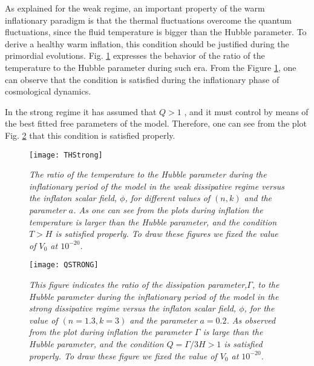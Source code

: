 \documentclass[12pt]{revtex4}
\begin{document}
{As explained for the weak regime, an important property of the warm inflationary paradigm is that the thermal fluctuations overcome the quantum fluctuations, since the fluid temperature is bigger than the Hubble parameter. To derive a healthy warm inflation, this condition should be justified during the primordial evolutions. Fig. \ref{thstrong} expresses the behavior of the ratio of the temperature to the Hubble parameter during such era. From the Figure \ref{thstrong}, one can observe that the condition is satisfied during the inflationary phase of cosmological dynamics.}

{In the strong regime  it has assumed that $Q>1$ , and it must control by means of the best fitted free parameters of the model. Therefore, one can see from the plot  Fig. \ref{QStrong} that this condition is satisfied properly.}

\begin{figure}[ht]
  \centering
  \texttt{[image: THStrong]}
  \caption{\emph{{The ratio of the temperature to the Hubble parameter during the inflationary period of the  model in the weak dissipative regime versus the inflaton scalar field, $\phi$, for different values of $(n,k)$ and the parameter $a$. As one can see from the plots during inflation the temperature is larger than the Hubble parameter, and the condition $T>H$ is satisfied properly. To draw these figures we fixed the value of $V_0$ at $10^{-20}$.}}}\label{thstrong}
\end{figure}%


\begin{figure}[ht]
  \centering
  \texttt{[image: QSTRONG]}
  \caption{\emph{{{This figure indicates the ratio of the dissipation parameter,$\Gamma$, to the Hubble parameter during the inflationary period of the  model in the strong dissipative regime versus the inflaton scalar field, $\phi$, for the value of $(n=1.3,k=3)$ and the parameter $a=0.2$. As observed from the plot during inflation the parameter $\Gamma$ is  large than the Hubble parameter, and the condition $Q=\Gamma/3H>1$ is satisfied properly. To draw these figure we fixed the value of $V_0$ at $10^{-20}$}}.}}\label{QStrong}
\end{figure}%
\end{document}
